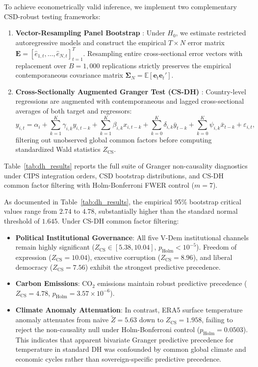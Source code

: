 \documentclass[11pt,a4paper]{article}
\begin{document}
To achieve econometrically valid inference, we implement two complementary CSD-robust testing frameworks:
\begin{enumerate}[leftmargin=*, label=(\roman*)]
    \item \textbf{Vector-Resampling Panel Bootstrap} \citep{emirmahmutoglu2011, lopez2017}: Under $H_0$, we estimate restricted autoregressive models and construct the empirical $T \times N$ error matrix $\mathbf{E} = [\hat{e}_{1,t}, \dots, \hat{e}_{N,t}]_{t=1}^T$. Resampling entire cross-sectional error vectors with replacement over $B=1{,}000$ replications strictly preserves the empirical contemporaneous covariance matrix $\boldsymbol{\Sigma}_N = \mathbb{E}[\mathbf{e}_t \mathbf{e}_t']$.
    \item \textbf{Cross-Sectionally Augmented Granger Test (CS-DH)} \citep{chudik2015, chudik2016}: Country-level regressions are augmented with contemporaneous and lagged cross-sectional averages of both target and regressors:
    \begin{equation}
    y_{i,t} = \alpha_i + \sum_{k=1}^K \gamma_{i,k} y_{i,t-k} + \sum_{k=1}^K \beta_{i,k} x_{i,t-k} + \sum_{k=0}^K \delta_{i,k} \bar{y}_{t-k} + \sum_{k=0}^K \psi_{i,k} \bar{x}_{t-k} + \varepsilon_{i,t},
    \end{equation}
    filtering out unobserved global common factors before computing standardized Wald statistics $Z_{\text{CS}}$.
\end{enumerate}

Table~\ref{tab:dh_results} reports the full suite of Granger non-causality diagnostics under CIPS integration orders, CSD bootstrap distributions, and CS-DH common factor filtering with Holm-Bonferroni FWER control ($m=7$).



As documented in Table~\ref{tab:dh_results}, the empirical 95\% bootstrap critical values range from $2.74$ to $4.78$, substantially higher than the standard normal threshold of $1.645$. Under CS-DH common factor filtering:
\begin{itemize}[leftmargin=*]
    \item \textbf{Political Institutional Governance}: All five V-Dem institutional channels remain highly significant ($Z_{\text{CS}} \in [5.38, 10.04]$, $p_{\text{Holm}} < 10^{-5}$). Freedom of expression ($Z_{\text{CS}} = 10.04$), executive corruption ($Z_{\text{CS}} = 8.96$), and liberal democracy ($Z_{\text{CS}} = 7.56$) exhibit the strongest predictive precedence.
    \item \textbf{Carbon Emissions}: $\text{CO}_2$ emissions maintain robust predictive precedence ($Z_{\text{CS}} = 4.78$, $p_{\text{Holm}} = 3.57 \times 10^{-6}$).
    \item \textbf{Climate Anomaly Attenuation}: In contrast, ERA5 surface temperature anomaly attenuates from naive $\tilde{Z} = 5.63$ down to $Z_{\text{CS}} = 1.958$, failing to reject the non-causality null under Holm-Bonferroni control ($p_{\text{Holm}} = 0.0503$). This indicates that apparent bivariate Granger predictive precedence for temperature in standard DH was confounded by common global climate and economic cycles rather than sovereign-specific predictive precedence.
\end{itemize}
\end{document}
